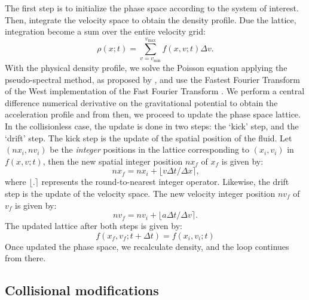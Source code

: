 \documentclass[fleqn,usenatbib]{mnras}
\newcommand{\toInt}[1]{\ensuremath{\lfloor#1\rceil}}
\begin{document}
The first step is to initialize the phase space according to the system of interest. 
Then, integrate the velocity space to obtain the density profile. Due the lattice, integration become a sum over the entire velocity grid:%
\begin{equation}
\label{eq: sum_density}
\rho (x;t)= \sum\limits_{v= v_{\text{min}}}^{v_{\text{max}}} f(x,v;t) \Delta v\text{.}
\end{equation}
With the physical density profile, we solve the Poisson equation applying the pseudo-spectral method, as proposed by \citet{2014arXiv1409.8116F}, and use the Fastest Fourier Transform of the West implementation of the Fast Fourier Transform \citep{FFTW}. We perform a central difference numerical derivative on the gravitational potential to obtain the acceleration profile and from then, we proceed to update the phase space lattice. In the collisionless case, the update is done in two steps: the `kick' step, and the `drift' step. 
The kick step is the update of the spatial position of the fluid. Let $(nx_i,nv_i)$ be the \emph{integer} positions in the lattice corresponding to $(x_i,v_i)$ in $f(x,v;t)$, then the new spatial integer position $nx_f$ of $x_f$ is given by:
\begin{equation}
nx_f = nx_i + \toInt{ v \Delta t/ \Delta x}\text{,}
\end{equation}
where $\toInt{.}$ represents the round-to-nearest integer operator. Likewise, the drift step is the update of the velocity space. The new velocity integer position $nv_f$ of $v_f$ is given by:
\begin{equation}
nv_f = nv_i + \toInt{ a \Delta t/ \Delta v}.
\end{equation}
The updated lattice after both steps is given by:
\begin{equation}
f(x_f,v_f;t+\Delta t) = f(x_i,v_i;t) 
\end{equation}
Once updated the phase space, we recalculate density, and the loop continues from there.
\subsection{Collisional modifications}
\label{sec: collisional}
\end{document}
